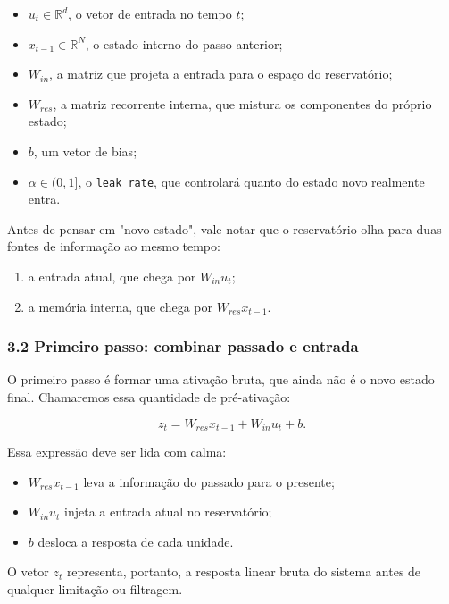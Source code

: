 \documentclass[12pt]{article}
\providecommand{\tightlist}{%
  \setlength{\itemsep}{0pt}\setlength{\parskip}{0pt}}
\begin{document}
\begin{itemize}
\tightlist
\item
  \(u_t \in \mathbb{R}^d\), o vetor de entrada no tempo \(t\);
\item
  \(x_{t-1} \in \mathbb{R}^N\), o estado interno do passo anterior;
\item
  \(W_{in}\), a matriz que projeta a entrada para o espaço do reservatório;
\item
  \(W_{res}\), a matriz recorrente interna, que mistura os componentes do próprio estado;
\item
  \(b\), um vetor de bias;
\item
  \(\alpha \in (0,1]\), o \texttt{leak\_rate}, que controlará quanto do estado novo realmente entra.
\end{itemize}

Antes de pensar em "novo estado", vale notar que o reservatório olha para duas fontes de informação ao mesmo tempo:

\begin{enumerate}
\def\labelenumi{\arabic{enumi}.}
\tightlist
\item
  a entrada atual, que chega por \(W_{in} u_t\);
\item
  a memória interna, que chega por \(W_{res} x_{t-1}\).
\end{enumerate}

\subsubsection{3.2 Primeiro passo: combinar passado e entrada}\label{32-primeiro-passo-combinar-passado-e-entrada}

O primeiro passo é formar uma ativação bruta, que ainda não é o novo estado final. Chamaremos essa quantidade de pré-ativação:

\[
z_t = W_{res} x_{t-1} + W_{in} u_t + b.
\]

Essa expressão deve ser lida com calma:

\begin{itemize}
\tightlist
\item
  \(W_{res} x_{t-1}\) leva a informação do passado para o presente;
\item
  \(W_{in} u_t\) injeta a entrada atual no reservatório;
\item
  \(b\) desloca a resposta de cada unidade.
\end{itemize}

O vetor \(z_t\) representa, portanto, a resposta linear bruta do sistema antes de qualquer limitação ou filtragem.
\end{document}
